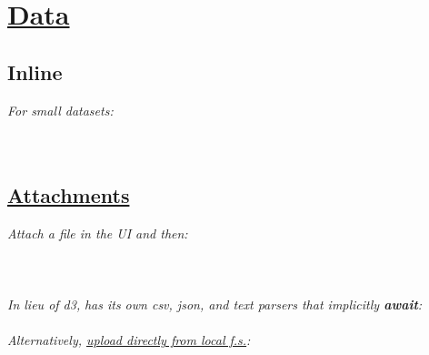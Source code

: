 \section{\href{https://observablehq.com/@observablehq/introduction-to-data}{Data}}


\subsection*{Inline}
\textit{For small datasets:}\\
\\
\\


\subsection*{\href{https://observablehq.com/@observablehq/file-attachments}{Attachments}}

\textit{Attach a file in the UI and then:}\\
\\
\\
\\

\textit{In lieu of d3, }\textit{ has its own csv, json, and text parsers that implicitly {\rm\bf await}:}\\
\\

\textit{Alternatively, \href{https://observablehq.com/@mbostock/reading-local-files}{upload directly from local f.s.}:}\\
\\
{\footnotesize {}}\\


